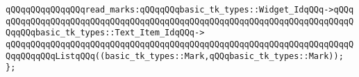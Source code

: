\newline
\verb|qQQqqQQqqQQqqQQqread_marks:qQQqqQQqbasic_tk_types::Widget_IdqQQq->qQQq|\newline
\verb|qQQqqQQqqQQqqQQqqQQqqQQqqQQqqQQqqQQqqQQqqQQqqQQqqQQqqQQqqQQqqQQqqQQqqQQqqQQqbasic_tk_types::Text_Item_IdqQQq->|\newline
\verb|qQQqqQQqqQQqqQQqqQQqqQQqqQQqqQQqqQQqqQQqqQQqqQQqqQQqqQQqqQQqqQQqqQQqqQQqqQQqqQQqListqQQq((basic_tk_types::Mark,qQQqbasic_tk_types::Mark));|\newline
\newline
\verb|};|\newline
\newline
\newline
\newline

